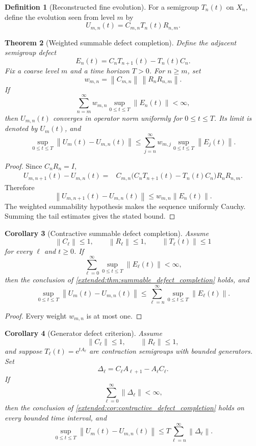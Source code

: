 \documentclass[11pt,a4paper]{article}
\newtheorem{theorem}{Theorem}[section]
\newtheorem{corollary}[theorem]{Corollary}
\theoremstyle{definition}
\newtheorem{definition}[theorem]{Definition}
\theoremstyle{remark}
\newcommand{\norm}[1]{\left\lVert#1\right\rVert}
\newcommand{\e}{\mathrm e}
\begin{document}
\begin{definition}[Reconstructed fine evolution]\label{extended:record:018}
For a semigroup \(T_n(t)\) on \(X_n\), define the evolution seen from level \(m\) by
\[
U_{m,n}(t)=C_{m,n}T_n(t)R_{n,m}.
\]
\end{definition}

\begin{theorem}[Weighted summable defect completion]\label{extended:record:019}\label{extended:thm:summable_defect_completion}
Define the adjacent semigroup defect
\[
E_n(t)=C_nT_{n+1}(t)-T_n(t)C_n.
\]
Fix a coarse level \(m\) and a time horizon \(T>0\). For \(n\geq m\), set
\[
w_{m,n}
=
\norm{C_{m,n}}\,
\norm{R_nR_{n,m}}.
\]
If
\[
\sum_{n=m}^{\infty}
w_{m,n}
\sup_{0\leq t\leq T}\norm{E_n(t)}<\infty,
\]
then \(U_{m,n}(t)\) converges in operator norm uniformly for \(0\leq t\leq T\). Its limit is denoted by \(U_m(t)\), and
\[
\sup_{0\leq t\leq T}
\norm{U_m(t)-U_{m,n}(t)}
\leq
\sum_{j=n}^{\infty}w_{m,j}
\sup_{0\leq t\leq T}\norm{E_j(t)}.
\]
\end{theorem}

\begin{proof}
Since \(C_nR_n=I\),
\[
\begin{aligned}
U_{m,n+1}(t)-U_{m,n}(t)
={}&
C_{m,n}
\bigl(C_nT_{n+1}(t)-T_n(t)C_n\bigr)
R_nR_{n,m}.
\end{aligned}
\]
Therefore
\[
\norm{U_{m,n+1}(t)-U_{m,n}(t)}
\leq
w_{m,n}\norm{E_n(t)}.
\]
The weighted summability hypothesis makes the sequence uniformly Cauchy. Summing the tail estimates gives the stated bound.
\end{proof}

\begin{corollary}[Contractive summable defect completion]\label{extended:record:020}\label{extended:cor:contractive_defect_completion}
Assume
\[
\norm{C_\ell}\leq1,
\qquad
\norm{R_\ell}\leq1,
\qquad
\norm{T_\ell(t)}\leq1
\]
for every \(\ell\) and \(t\geq0\). If
\[
\sum_{\ell=0}^{\infty}
\sup_{0\leq t\leq T}\norm{E_\ell(t)}<\infty,
\]
then the conclusion of \cref{extended:thm:summable_defect_completion} holds, and
\[
\sup_{0\leq t\leq T}
\norm{U_m(t)-U_{m,n}(t)}
\leq
\sum_{\ell=n}^{\infty}
\sup_{0\leq t\leq T}\norm{E_\ell(t)}.
\]
\end{corollary}

\begin{proof}
Every weight \(w_{m,n}\) is at most one.
\end{proof}

\begin{corollary}[Generator defect criterion]\label{extended:record:021}\label{extended:cor:generator_defect_completion}
Assume
\[
\norm{C_\ell}\leq1,
\qquad
\norm{R_\ell}\leq1,
\]
and suppose \(T_\ell(t)=\e^{tA_\ell}\) are contraction semigroups with bounded generators. Set
\[
\Delta_\ell=C_\ell A_{\ell+1}-A_\ell C_\ell.
\]
If
\[
\sum_{\ell=0}^{\infty}\norm{\Delta_\ell}<\infty,
\]
then the conclusion of \cref{extended:cor:contractive_defect_completion} holds on every bounded time interval, and
\[
\sup_{0\leq t\leq T}
\norm{U_m(t)-U_{m,n}(t)}
\leq
T\sum_{\ell=n}^{\infty}\norm{\Delta_\ell}.
\]
\end{corollary}
\end{document}
